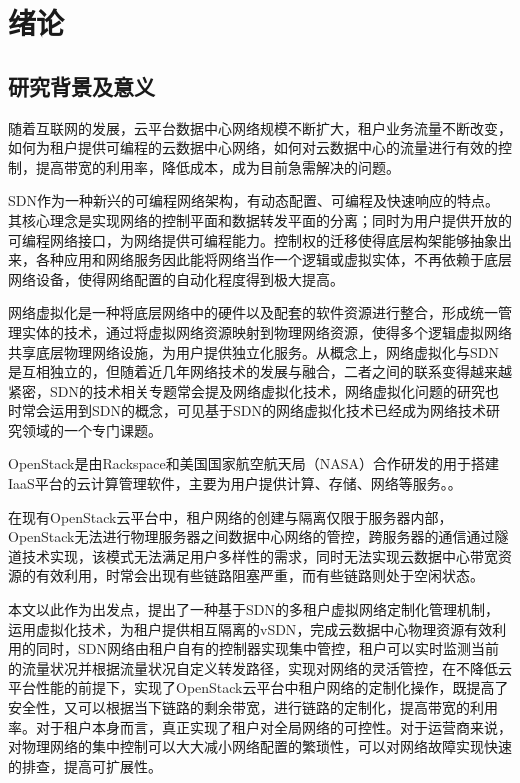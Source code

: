 
\chapter{绪论}
\section{研究背景及意义}
随着互联网的发展，云平台数据中心网络规模不断扩大，租户业务流量不断改变，如何为租户提供可编程的云数据中心网络，如何对云数据中心的流量进行有效的控制，提高带宽的利用率，降低成本，成为目前急需解决的问题。

\gls*{SDN}作为一种新兴的可编程网络架构\cite{SDN-0}，有动态配置、可编程及快速响应的特点。其核心理念是实现网络的控制平面和数据转发平面的分离；同时为用户提供开放的可编程网络接口，为网络提供可编程能力。控制权的迁移使得底层构架能够抽象出来，各种应用和网络服务因此能将网络当作一个逻辑或虚拟实体，不再依赖于底层网络设备\cite{SDN-1}，使得网络配置的自动化程度得到极大提高。

网络虚拟化\cite{Virtual-1}是一种将底层网络中的硬件以及配套的软件资源进行整合，形成统一管理实体的技术，通过将虚拟网络资源映射到物理网络资源，使得多个逻辑虚拟网络共享底层物理网络设施，为用户提供独立化服务。从概念上，网络虚拟化与SDN是互相独立的，但随着近几年网络技术的发展与融合，二者之间的联系变得越来越紧密，SDN的技术相关专题常会提及网络虚拟化技术，网络虚拟化问题的研究也时常会运用到SDN的概念，可见基于SDN的网络虚拟化技术已经成为网络技术研究领域的一个专门课题\cite{Virtual-2}。

OpenStack\cite{OpenStack-1}是由Rackspace和美国国家航空航天局（NASA）合作研发的用于搭建\gls*{IaaS}平台的云计算管理软件，主要为用户提供计算、存储、网络等服务。\cite{OpenStack-2}。

在现有OpenStack云平台中，租户网络的创建与隔离仅限于服务器内部，OpenStack无法进行物理服务器之间数据中心网络的管控，跨服务器的通信通过隧道技术实现，该模式无法满足用户多样性的需求，同时无法实现云数据中心带宽资源的有效利用，时常会出现有些链路阻塞严重，而有些链路则处于空闲状态。

本文以此作为出发点，提出了一种基于SDN的多租户虚拟网络定制化管理机制，运用虚拟化技术，为租户提供相互隔离的\gls*{vSDN}，完成云数据中心物理资源有效利用的同时，SDN网络由租户自有的控制器实现集中管控，租户可以实时监测当前的流量状况并根据流量状况自定义转发路径，实现对网络的灵活管控，在不降低云平台性能的前提下，实现了OpenStack云平台中租户网络的定制化操作，既提高了安全性，又可以根据当下链路的剩余带宽，进行链路的定制化，提高带宽的利用率。对于租户本身而言，真正实现了租户对全局网络的可控性。对于运营商来说，对物理网络的集中控制可以大大减小网络配置的繁琐性，可以对网络故障实现快速的排查，提高可扩展性。

